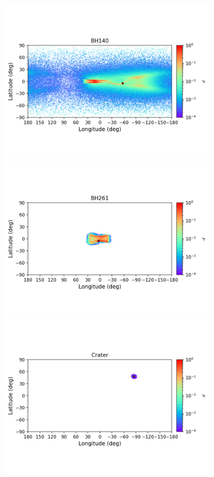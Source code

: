 \begin{figure}
\begin{center}
                \includegraphics[clip=true, trim = 0mm 20mm 0mm 10mm, width=1\columnwidth]{images/error_plots_BH140.png}
                \includegraphics[clip=true, trim = 0mm 20mm 0mm 10mm, width=1\columnwidth]{images/error_plots_BH261.png}
                \includegraphics[clip=true, trim = 0mm 20mm 0mm 10mm, width=1\columnwidth]{images/error_plots_Crater.png}

\end{center}
\end{figure}
